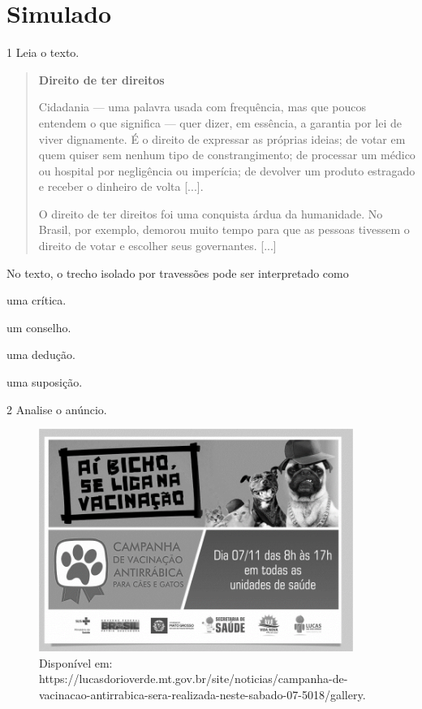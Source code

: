 \setcounter{chapter}{0}
\chapter[Simulado 1]{Simulado}

\num{1} Leia o texto.

\begin{quote}
\centering\textbf{Direito de ter direitos}

Cidadania --- uma palavra usada com frequência, mas que poucos entendem o
que significa --- quer dizer, em essência, a garantia por lei de viver
dignamente. É o direito de expressar as próprias ideias; de votar em
quem quiser sem nenhum tipo de constrangimento; de processar um médico
ou hospital por negligência ou imperícia; de devolver um produto
estragado e receber o dinheiro de volta {[}...{]}.

O direito de ter direitos foi uma conquista árdua da humanidade. No
Brasil, por exemplo, demorou muito tempo para que as pessoas tivessem o
direito de votar e escolher seus governantes. {[}...{]}

\end{quote}

No texto, o trecho isolado por travessões pode ser interpretado como

\begin{escolha}
\item uma crítica.

\item um conselho.

\item uma dedução.

\item uma suposição.
\end{escolha}

\num{2} Analise o anúncio.

\begin{figure}[H]
\centering
\includegraphics[width=4.03125in,height=2.85231in]{./imgSAEB_8_POR/media/image28.png}
\caption{Disponível em: https://lucasdorioverde.mt.gov.br/site/noticias/campanha-de-vacinacao-antirrabica-sera-realizada-neste-sabado-07-5018/gallery.}
\end{figure}

